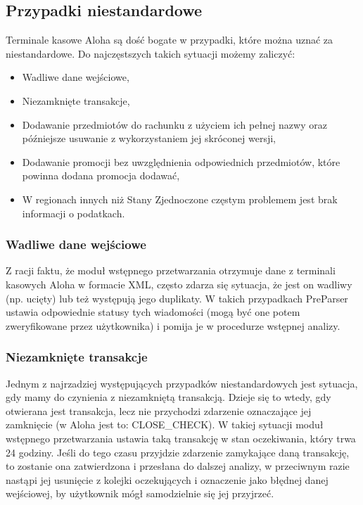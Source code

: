 \documentclass[a4paper]{book}
\begin{document}
\subsection{Przypadki niestandardowe}
Terminale kasowe Aloha są dość bogate w przypadki, które można uznać za niestandardowe. Do najczęstszych takich sytuacji możemy zaliczyć:
 \begin{itemize}
 	\item Wadliwe dane wejściowe,
 	\item Niezamknięte transakcje,
 	\item Dodawanie przedmiotów do rachunku z użyciem ich pełnej nazwy oraz późniejsze usuwanie z wykorzystaniem jej skróconej wersji,
 	\item Dodawanie promocji bez uwzględnienia odpowiednich przedmiotów, które powinna dodana promocja dodawać,
 	\item W regionach innych niż Stany Zjednoczone częstym problemem jest brak informacji o podatkach.
 \end{itemize}
\subsubsection{Wadliwe dane wejściowe}
Z racji faktu, że moduł wstępnego przetwarzania otrzymuje dane z terminali kasowych Aloha w formacie XML, często zdarza się sytuacja, że jest on wadliwy (np. ucięty) lub też występują jego duplikaty. W takich przypadkach PreParser ustawia odpowiednie statusy tych wiadomości (mogą być one potem zweryfikowane przez użytkownika) i pomija je w procedurze wstępnej analizy.
\subsubsection{Niezamknięte transakcje}
Jednym z najrzadziej występujących przypadków niestandardowych jest sytuacja, gdy mamy do czynienia z niezamkniętą transakcją. Dzieje się to wtedy, gdy otwierana jest transakcja, lecz nie przychodzi zdarzenie oznaczające jej zamknięcie (w Aloha jest to: CLOSE\_CHECK). W takiej sytuacji moduł wstępnego przetwarzania ustawia taką transakcję w stan oczekiwania, który trwa 24 godziny. Jeśli do tego czasu przyjdzie zdarzenie zamykające daną transakcję, to zostanie ona zatwierdzona i przesłana do dalszej analizy, w przeciwnym razie nastąpi jej usunięcie z kolejki oczekujących i oznaczenie jako błędnej danej wejściowej, by użytkownik mógł samodzielnie się jej przyjrzeć.
\end{document}
